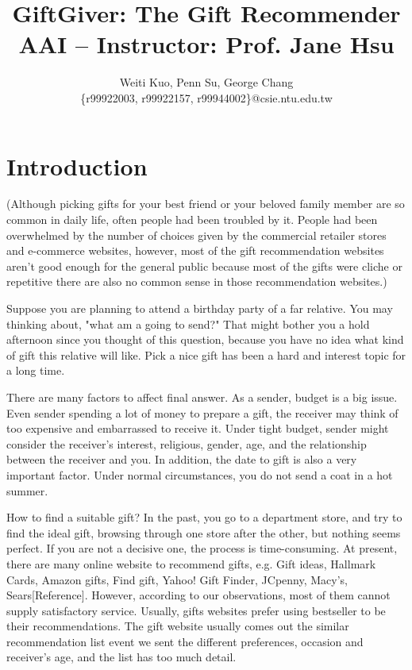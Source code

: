 \documentclass[11pt,twocolumn]{article}
\title{GiftGiver: The Gift Recommender \\ {\small AAI --
    Instructor: Prof. Jane Hsu}}
\author{Weiti Kuo, Penn Su, George Chang \\ \{r99922003, r99922157, r99944002\}@csie.ntu.edu.tw}
\begin{document}
\maketitle

\section{Introduction}

(Although picking gifts for your best friend or your beloved family member are so common in daily life, often people had been troubled by it. People had been overwhelmed by the number of choices given by the commercial retailer stores and e-commerce websites, however, most of the gift recommendation websites aren't good enough for the general public because most of the gifts were cliche or repetitive there are also no common sense in those recommendation websites.)

Suppose you are planning to attend a birthday party of a far relative.  You may thinking about, "what am a going to send?"  That might bother you a hold afternoon since you thought of this question, because you have no idea what kind of gift this relative will like.  Pick a nice gift has been a hard and interest topic for a long time.   

There are many factors to affect final answer. As a sender, budget is a big issue. Even sender spending a lot of money to prepare a gift, the receiver may think of too expensive and embarrassed to receive it.   Under tight budget, sender might consider the receiver's interest, religious, gender, age, and the relationship between the receiver and you. In addition, the date to gift is also a very important factor. Under normal circumstances, you do not send a coat in a hot summer.

How to find a suitable gift? In the past, you go to a department store, and try to find the ideal gift, browsing through one store after the other, but nothing seems perfect. If you are not a decisive one, the process is time-consuming. At present, there are many online website to recommend gifts, e.g. Gift ideas, Hallmark Cards, Amazon gifts, Find gift, Yahoo! Gift Finder, JCpenny, Macy's, Sears[Reference]. However, according to our observations, most of them cannot supply satisfactory service. Usually, gifts websites prefer using bestseller to be their recommendations. The gift website usually comes out the similar recommendation list event we sent the different preferences, occasion and receiver’s age, and the list has too much detail.
\end{document}
